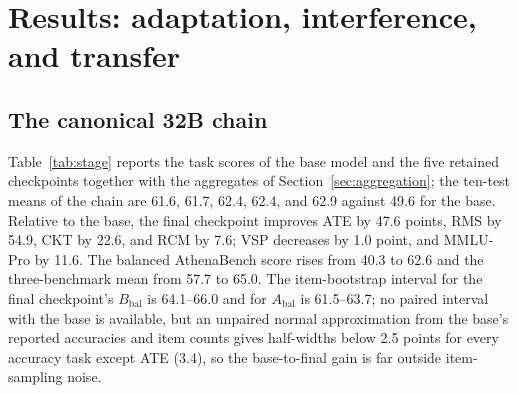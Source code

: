 \documentclass[a4paper,fleqn]{cas-dc}
\newcommand{\Abal}{A_{\mathrm{bal}}}
\newcommand{\Bbal}{B_{\mathrm{bal}}}
\begin{document}
\section{Results: adaptation, interference, and transfer}\label{sec:results}
\subsection{The canonical 32B chain}
Table~\ref{tab:stage} reports the task scores of the base model and the five retained checkpoints together with the aggregates of Section~\ref{sec:aggregation}; the ten-test means of the chain are 61.6, 61.7, 62.4, 62.4, and 62.9 against 49.6 for the base. Relative to the base, the final checkpoint improves ATE by 47.6 points, RMS by 54.9, CKT by 22.6, and RCM by 7.6; VSP decreases by 1.0 point, and MMLU-Pro by 11.6. The balanced AthenaBench score rises from 40.3 to 62.6 and the three-benchmark mean from 57.7 to 65.0. The item-bootstrap interval for the final checkpoint's $\Bbal$ is 64.1--66.0 and for $\Abal$ is 61.5--63.7; no paired interval with the base is available, but an unpaired normal approximation from the base's reported accuracies and item counts gives half-widths below 2.5 points for every accuracy task except ATE (3.4), so the base-to-final gain is far outside item-sampling noise.
\end{document}
